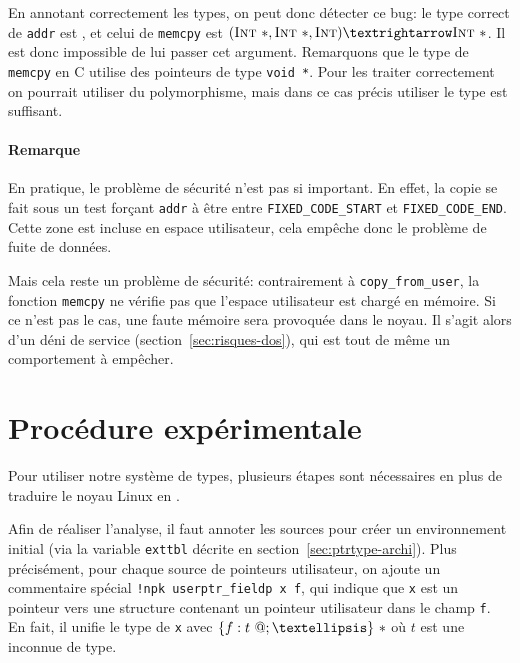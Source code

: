 En annotant correctement les types, on peut donc détecter ce bug: le type
correct de \texttt{addr} est \ptrU{\tInt}, et celui de \texttt{memcpy} est
$(\ptrK{\tInt}, \ptrK{\tInt}, \tInt) → \ptrK{\tInt}$. Il est donc impossible de
lui passer cet argument. Remarquons que le type de \texttt{memcpy} en C utilise
des pointeurs de type \texttt{void *}. Pour les traiter correctement on pourrait
utiliser du polymorphisme, mais dans ce cas précis utiliser le type \ptrK{\tInt}
est suffisant.

\paragraph{Remarque}

En pratique, le problème de sécurité n'est pas si important. En effet,
la copie se fait sous un test forçant \texttt{addr} à être entre
\nolinkurl{FIXED\_CODE\_START} et \texttt{FIXED\_CODE\_END}. Cette zone est
incluse en espace utilisateur, cela empêche donc le problème de fuite de
données.

Mais cela reste un problème de sécurité: contrairement à
\texttt{copy\_from\_user}, la fonction \texttt{memcpy} ne vérifie pas que
l'espace utilisateur est chargé en mémoire. Si ce n'est pas le cas, une faute
mémoire sera provoquée dans le noyau. Il s'agit alors d'un déni de service
(section~\ref{sec:risques-dos}), qui est tout de même un comportement à
empêcher.

\section{Procédure expérimentale}
\label{sec:demo-unif}

Pour utiliser notre système de types, plusieurs étapes sont nécessaires en plus
de traduire le noyau Linux en \langname{}.

Afin de réaliser l'analyse, il faut annoter les sources pour créer un
environnement initial (via la variable \texttt{exttbl} décrite en
section~\ref{sec:ptrtype-archi}). Plus précisément, pour chaque source de
pointeurs utilisateur, on ajoute un commentaire spécial \texttt{!npk
userptr\_fieldp x f}, qui indique que \texttt{x} est un pointeur vers une
structure contenant un pointeur utilisateur dans le champ \texttt{f}. En fait,
il unifie le type de \texttt{x} avec $\{ f: \ptrU{t} ; … \}~*$ où $t$ est une
inconnue de type.


